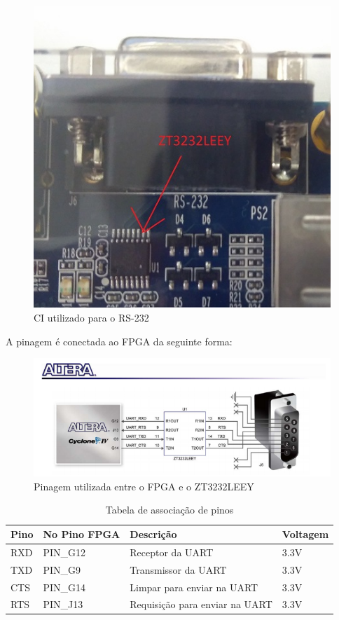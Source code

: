 \documentclass[12pt,a4paper]{article} %
\begin{document}
\begin{figure}[!htb]
\centering
	\includegraphics[scale=0.5]{imagens/IMG_20171123_110859}
	\caption{CI utilizado para o RS-232}
	\label{CI}
\end{figure}
A pinagem é conectada ao FPGA da seguinte forma:
\begin{figure}[!htb]
	\includegraphics{imagens/conexo.png}
	\caption{Pinagem utilizada entre o FPGA e o ZT3232LEEY}
	\label{Conexao}
\end{figure}

\begin{table}[!htb]
\centering
\caption{Tabela de associação de pinos}
\label{pin_assignment}
\begin{tabular}{|l|l|l|l|}
\hline
\textbf{Pino} &\textbf{No Pino FPGA} & \textbf{Descrição} & 
\textbf{Voltagem} \\ \hline
RXD         & PIN\_G12    & Receptor da UART               & 3.3V     \\ 
\hline
TXD         & PIN\_G9     & Transmissor da UART            & 3.3V     \\ 
\hline
CTS         & PIN\_G14    & Limpar para enviar na UART     & 3.3V     \\ 
\hline
RTS         & PIN\_J13    & Requisição para enviar na UART & 3.3V     \\ 
\hline
\end{tabular}
\end{table}
\end{document}
